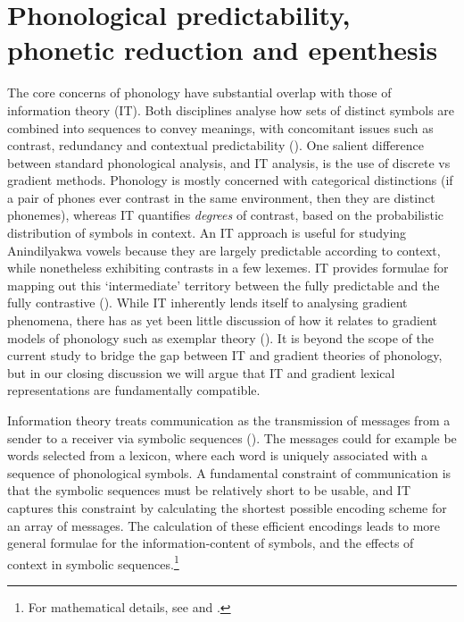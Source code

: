 \documentclass[output=paper,colorlinks,citecolor=brown]{langscibook}
\begin{document}
\section{Phonological predictability, phonetic reduction and epenthesis}\label{sec:mansfield:2}

The core concerns of phonology have substantial overlap with those of information theory (IT). Both disciplines analyse how sets of distinct symbols are combined into sequences to convey meanings, with concomitant issues such as contrast, redundancy and contextual predictability (\citealt{Hockett:1967,Goldsmith2000}). One salient difference between standard phonological analysis, and IT analysis, is the use of discrete vs gradient methods. Phonology is mostly concerned with categorical distinctions (if a pair of phones ever contrast in the same environment, then they are distinct phonemes), whereas IT quantifies \textit{degrees} of contrast, based on the probabilistic distribution of symbols in context. An IT approach is useful for studying Anindilyakwa vowels because they are largely predictable according to context, while nonetheless exhibiting contrasts in a few lexemes. IT provides formulae for mapping out this ‘intermediate’ territory between the fully predictable and the fully contrastive (\citealt{Hall2009,hallk2013typology,Parker2015}).  While IT inherently lends itself to analysing gradient phenomena, there has as yet been little discussion of how it relates to gradient models of phonology such as exemplar theory (\citealt{bybee2000phonology,pierrehumbert2001exemplar}). It is beyond the scope of the current study to bridge the gap between IT and gradient theories of phonology, but in our closing discussion we will argue that IT and gradient lexical representations are fundamentally compatible.

Information theory treats communication as the transmission of messages from a sender to a receiver via symbolic sequences (\citealt{Hartley1928,Shannon1948}). The messages could for example be words selected from a lexicon, where each word is uniquely associated with a sequence of phonological symbols. A fundamental constraint of communication is that the symbolic sequences must be relatively short to be usable, and IT captures this constraint by calculating the shortest possible encoding scheme for an array of messages. The calculation of these efficient encodings leads to more general formulae for the information-content of symbols, and the effects of context in symbolic sequences.\footnote{For mathematical details, see \citet{Shannon1948} and \citet{CoverThomas2002}.}
\end{document}
